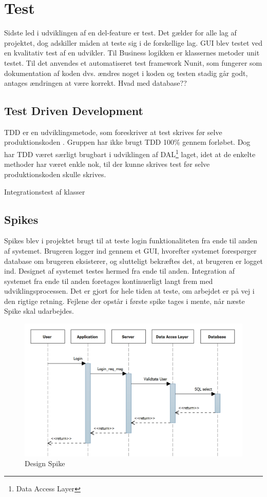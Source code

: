 \section{Test}
Sidste led i udviklingen af en del-feature er test. Det gælder for alle lag af projektet, dog adskiller måden at teste sig i de forskellige lag. GUI blev testet ved en kvalitativ test af en udvikler. Til Business logikken er klassernes metoder unit testet. Til det anvendes et automatiseret test framework Nunit, som fungerer som dokumentation af koden dvs. ændres noget i koden og testen stadig går godt, antages ændringen at være korrekt. Hvad med database??

\subsection{Test Driven Development}
TDD er en udviklingsmetode, som foreskriver at test skrives før selve produktionskoden \cite{osherove2015art}. Gruppen har ikke brugt TDD 100\% gennem forløbet. 
Dog har TDD været særligt brugbart i udviklingen af DAL\footnote{Data Access Layer} laget, idet at de enkelte methoder har været enkle nok, til der kunne skrives test før selve produktionskoden skulle skrives.

Integrationstest af klasser

\subsection{Spikes} %
Spikes blev i projektet brugt til at teste login funktionaliteten fra ende til anden af systemet. Brugeren logger ind gennem et GUI, hvorefter systemet forespørger database om brugeren eksisterer, og slutteligt bekræftes det, at brugeren er logget ind. Designet af systemet testes hermed fra ende til anden. Integration af systemet fra ende til anden foretages kontinuerligt langt frem med udviklingsprocessen. Det er gjort for hele tiden at teste, om arbejdet er på vej i den rigtige retning. Fejlene der opstår i første spike tages i mente, når næste Spike skal udarbejdes. 

\begin{figure}
	\centering
	\includegraphics[width=0.9\linewidth]{figs/processProjektGennemforsel/Spike.PNG}
	\caption{Design Spike}
	\label{fig:design_spike}
\end{figure}

